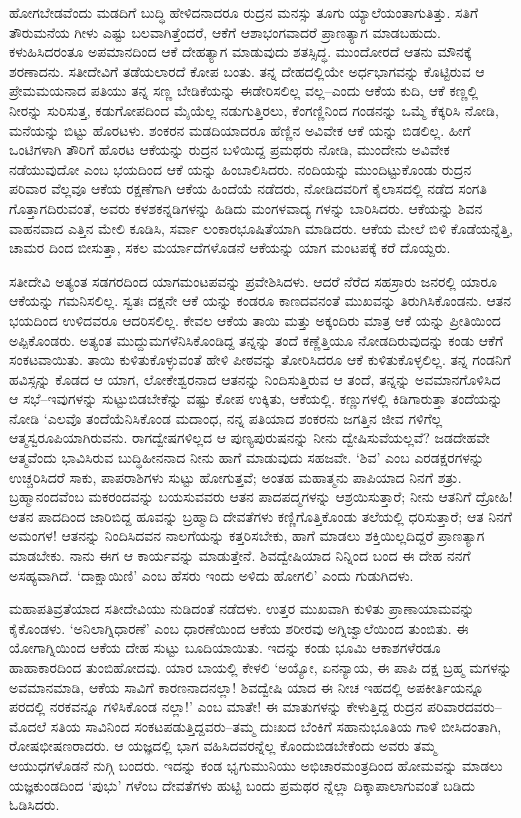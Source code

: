 ಹೋಗಬೇಡವೆಂದು ಮಡದಿಗೆ ಬುದ್ಧಿ ಹೇಳಿದನಾದರೂ ರುದ್ರನ ಮನಸ್ಸು ತೂಗು ಯ್ಯಾಲೆಯಂತಾಗುತಿತ್ತು. ಸತಿಗೆ ತೌರುಮನೆಯ ಗೀಳು ಎಷ್ಟು ಬಲವಾಗಿತ್ತೆಂದರೆ, ಆಕೆಗೆ ಆಶಾಭಂಗವಾದರೆ ಪ್ರಾಣತ್ಯಾಗ ಮಾಡಬಹುದು. ಕಳುಹಿಸಿದರಂತೂ ಅಪಮಾನದಿಂದ ಆಕೆ ದೇಹತ್ಯಾಗ ಮಾಡುವುದು ಶತಸ್ಸಿದ್ಧ. ಮುಂದೋರದೆ ಆತನು ಮೌನಕ್ಕೆ ಶರಣಾದನು. ಸತೀದೇವಿಗೆ ತಡೆಯಲಾರದೆ ಕೋಪ ಬಂತು. ತನ್ನ ದೇಹದಲ್ಲಿಯೇ ಅರ್ಧಭಾಗವನ್ನು ಕೊಟ್ಟಿರುವ ಆ ಪ್ರೇಮಮಯನಾದ ಪತಿಯು ತನ್ನ ಸಣ್ಣ ಬೇಡಿಕೆಯನ್ನು ಈಡೇರಿಸಲಿಲ್ಲ ವಲ್ಲ–ಎಂದು ಆಕೆಯ ಕುದಿ, ಆಕೆ ಕಣ್ಣಲ್ಲಿ ನೀರನ್ನು ಸುರಿಸುತ್ತ, ಕಡುಗೋಪದಿಂದ ಮೈಯೆಲ್ಲ ನಡುಗುತ್ತಿರಲು, ಕೆಂಗಣ್ಣಿನಿಂದ ಗಂಡನನ್ನು ಒಮ್ಮೆ ಕೆಕ್ಕರಿಸಿ ನೋಡಿ, ಮನೆಯನ್ನು ಬಿಟ್ಟು ಹೊರಟಳು. ಶಂಕರನ ಮಡದಿಯಾದರೂ ಹೆಣ್ಣಿನ ಅವಿವೇಕ ಆಕೆ ಯನ್ನು ಬಿಡಲಿಲ್ಲ. ಹೀಗೆ ಒಂಟಿಗಳಾಗಿ ತೌರಿಗೆ ಹೊರಟ ಆಕೆಯನ್ನು ರುದ್ರನ ಬಳಿಯಿದ್ದ ಪ್ರಮಥರು ನೋಡಿ, ಮುಂದೇನು ಅವಿವೇಕ ನಡೆಯುವುದೋ ಎಂಬ ಭಯದಿಂದ ಆಕೆ ಯನ್ನು ಹಿಂಬಾಲಿಸಿದರು. ನಂದಿಯನ್ನು ಮುಂದಿಟ್ಟುಕೊಂಡು ರುದ್ರನ ಪರಿವಾರ ವೆಲ್ಲವೂ ಆಕೆಯ ರಕ್ಷಣೆಗಾಗಿ ಆಕೆಯ ಹಿಂದೆಯೆ ನಡೆದರು, ನೋಡಿದವರಿಗೆ ಕೈಲಾಸದಲ್ಲಿ ನಡೆದ ಸಂಗತಿ ಗೊತ್ತಾಗದಿರುವಂತೆ, ಅವರು ಕಳಶಕನ್ನಡಿಗಳನ್ನು ಹಿಡಿದು ಮಂಗಳವಾದ್ಯ ಗಳನ್ನು ಬಾರಿಸಿದರು. ಆಕೆಯನ್ನು ಶಿವನ ವಾಹನವಾದ ಎತ್ತಿನ ಮೇಲಿ ಕೂಡಿಸಿ, ಸರ್ವಾ ಲಂಕಾರಭೂಷಿತೆಯಾಗಿ ಮಾಡಿದರು. ಆಕೆಯ ಮೇಲೆ ಬಿಳಿ ಕೊಡೆಯನ್ನೆತ್ತಿ, ಚಾಮರ ದಿಂದ ಬೀಸುತ್ತಾ, ಸಕಲ ಮರ್ಯಾದೆಗಳೊಡನೆ ಆಕೆಯನ್ನು ಯಾಗ ಮಂಟಪಕ್ಕೆ ಕರೆ ದೊಯ್ದರು.

ಸತೀದೇವಿ ಅತ್ಯಂತ ಸಡಗರದಿಂದ ಯಾಗಮಂಟಪವನ್ನು ಪ್ರವೇಶಿಸಿದಳು. ಆದರೆ ನೆರೆದ ಸಹಸ್ರಾರು ಜನರಲ್ಲಿ ಯಾರೂ ಆಕೆಯನ್ನು ಗಮನಿಸಲಿಲ್ಲ. ಸ್ವತಃ ದಕ್ಷನೇ ಆಕೆ ಯನ್ನು ಕಂಡರೂ ಕಾಣದವನಂತೆ ಮುಖವನ್ನು ತಿರುಗಿಸಿಕೊಂಡನು. ಆತನ ಭಯದಿಂದ ಉಳಿದವರೂ ಆದರಿಸಲಿಲ್ಲ. ಕೇವಲ ಆಕೆಯ ತಾಯಿ ಮತ್ತು ಅಕ್ಕಂದಿರು ಮಾತ್ರ ಆಕೆ ಯನ್ನು ಪ್ರೀತಿಯಿಂದ ಅಪ್ಪಿಕೊಂಡರು. ಅತ್ಯಂತ ಮುದ್ದುಮಗಳೆನಿಸಿಕೊಂಡಿದ್ದ ತನ್ನನ್ನು ತಂದೆ ಕಣ್ಣೆತ್ತಿಯೂ ನೋಡದಿರುವುದನ್ನು ಕಂಡು ಆಕೆಗೆ ಸಂಕಟವಾಯಿತು. ತಾಯಿ ಕುಳಿತುಕೊಳ್ಳುವಂತೆ ಹೇಳಿ ಪೀಠವನ್ನು ತೋರಿಸಿದರೂ ಆಕೆ ಕುಳಿತುಕೊಳ್ಳಲಿಲ್ಲ. ತನ್ನ ಗಂಡನಿಗೆ ಹವಿಸ್ಸನ್ನು ಕೊಡದ ಆ ಯಾಗ, ಲೋಕೇಶ್ವರನಾದ ಆತನನ್ನು ನಿಂದಿಸುತ್ತಿರುವ ಆ ತಂದೆ, ತನ್ನನ್ನು ಅವಮಾನಗೊಳಿಸಿದ ಆ ಸಭೆ–ಇವುಗಳನ್ನು ಸುಟ್ಟುಬಿಡಬೇಕೆನ್ನು ವಷ್ಟು ಕೋಪ ಉಕ್ಕಿತು, ಆಕೆಯಲ್ಲಿ. ಕಣ್ಣುಗಳಲ್ಲಿ ಕಿಡಿಗಾರುತ್ತಾ ತಂದೆಯನ್ನು ನೋಡಿ ‘ಎಲವೊ ತಂದೆಯೆನಿಸಿಕೊಂಡ ಮದಾಂಧ, ನನ್ನ ಪತಿಯಾದ ಶಂಕರನು ಜಗತ್ತಿನ ಜೀವ ಗಳಿಗೆಲ್ಲ ಆತ್ಮಸ್ವರೂಪಿಯಾಗಿರುವನು. ರಾಗದ್ವೇಷಗಳಿಲ್ಲದ ಆ ಪುಣ್ಯಪುರುಷನನ್ನು ನೀನು ದ್ವೇಷಿಸುವೆಯಲ್ಲವೆ? ಜಡದೇಹವೇ ಆತ್ಮವೆಂದು ಭಾವಿಸಿರುವ ಬುದ್ಧಿಹೀನನಾದ ನೀನು ಹಾಗೆ ಮಾಡುವುದು ಸಹಜವೇ. ‘ಶಿವ’ ಎಂಬ ಎರಡಕ್ಷರಗಳನ್ನು ಉಚ್ಚರಿಸಿದರೆ ಸಾಕು, ಪಾಪರಾಶಿಗಳು ಸುಟ್ಟು ಹೋಗುತ್ತವೆ; ಅಂತಹ ಮಹಾತ್ಮನು ಪಾಪಿಯಾದ ನಿನಗೆ ಶತ್ರು. ಬ್ರಹ್ಮಾನಂದವೆಂಬ ಮಕರಂದವನ್ನು ಬಯಸುವವರು ಆತನ ಪಾದಪದ್ಮಗಳನ್ನು ಆಶ್ರಯಿಸುತ್ತಾರೆ; ನೀನು ಆತನಿಗೆ ದ್ರೋಹಿ! ಆತನ ಪಾದದಿಂದ ಜಾರಿಬಿದ್ದ ಹೂವನ್ನು ಬ್ರಹ್ಮಾದಿ ದೇವತೆಗಳು ಕಣ್ಣಿಗೊತ್ತಿಕೊಂಡು ತಲೆಯಲ್ಲಿ ಧರಿಸುತ್ತಾರೆ; ಆತ ನಿನಗೆ ಅಮಂಗಳ! ಆತನನ್ನು ನಿಂದಿಸಿದವನ ನಾಲಗೆಯನ್ನು ಕತ್ತರಿಸಬೇಕು, ಹಾಗೆ ಮಾಡಲು ಶಕ್ತಿಯಿಲ್ಲದಿದ್ದರೆ ಪ್ರಾಣತ್ಯಾಗ ಮಾಡಬೇಕು. ನಾನು ಈಗ ಆ ಕಾರ್ಯವನ್ನು ಮಾಡುತ್ತೇನೆ. ಶಿವದ್ವೇಷಿಯಾದ ನಿನ್ನಿಂದ ಬಂದ ಈ ದೇಹ ನನಗೆ ಅಸಹ್ಯವಾಗಿದೆ. ‘ದಾಕ್ಷಾಯಿಣಿ’ ಎಂಬ ಹೆಸರು ಇಂದು ಅಳಿದು ಹೋಗಲಿ’ ಎಂದು ಗುಡುಗಿದಳು.

ಮಹಾಪತಿವ್ರತೆಯಾದ ಸತೀದೇವಿಯು ನುಡಿದಂತೆ ನಡೆದಳು. ಉತ್ತರ ಮುಖವಾಗಿ ಕುಳಿತು ಪ್ರಾಣಾಯಾಮವನ್ನು ಕೈಕೊಂಡಳು. ‘ಅನಿಲಾಗ್ನಿಧಾರಣೆ’ ಎಂಬ ಧಾರಣೆಯಿಂದ ಆಕೆಯ ಶರೀರವು ಅಗ್ನಿಜ್ವಾಲೆಯಿಂದ ತುಂಬಿತು. ಈ ಯೋಗಾಗ್ನಿಯಿಂದ ಆಕೆಯ ದೇಹ ಸುಟ್ಟು ಬೂದಿಯಾಯಿತು. ಇದನ್ನು ಕಂಡು ಭೂಮಿ ಆಕಾಶಗಳೆರಡೂ ಹಾಹಾಕಾರದಿಂದ ತುಂಬಿಹೋದವು. ಯಾರ ಬಾಯಲ್ಲಿ ಕೇಳಲಿ ‘ಅಯ್ಯೋ, ಏನನ್ಯಾಯ, ಈ ಪಾಪಿ ದಕ್ಷ ಬ್ರಹ್ಮ ಮಗಳನ್ನು ಅವಮಾನಮಾಡಿ, ಆಕೆಯ ಸಾವಿಗೆ ಕಾರಣನಾದನಲ್ಲಾ! ಶಿವದ್ವೇಷಿ ಯಾದ ಈ ನೀಚ ಇಹದಲ್ಲಿ ಅಪಕೀರ್ತಿಯನ್ನೂ ಪರದಲ್ಲಿ ನರಕವನ್ನೂ ಗಳಿಸಿಕೊಂಡ ನಲ್ಲಾ!’ ಎಂಬ ಮಾತೇ! ಈ ಮಾತುಗಳನ್ನು ಕೇಳುತ್ತಿದ್ದ ರುದ್ರನ ಪರಿವಾರದವರು– ಮೊದಲೆ ಸತಿಯ ಸಾವಿನಿಂದ ಸಂಕಟಪಡುತ್ತಿದ್ದವರು–ತಮ್ಮ ದುಃಖದ ಬೆಂಕಿಗೆ ಸಹಾನುಭೂತಿಯ ಗಾಳಿ ಬೀಸಿದಂತಾಗಿ, ರೋಷಭೀಷಣರಾದರು. ಆ ಯಜ್ಞದಲ್ಲಿ ಭಾಗ ವಹಿಸಿದವರನ್ನೆಲ್ಲ ಕೊಂದುಬಿಡಬೇಕೆಂದು ಅವರು ತಮ್ಮ ಆಯುಧಗಳೊಡನೆ ನುಗ್ಗಿ ಬಂದರು. ಇದನ್ನು ಕಂಡ ಭೃಗುಮುನಿಯು ಅಭಿಚಾರಮಂತ್ರದಿಂದ ಹೋಮವನ್ನು ಮಾಡಲು ಯಜ್ಞಕುಂಡದಿಂದ ‘ಪುಭು’ ಗಳೆಂಬ ದೇವತೆಗಳು ಹುಟ್ಟಿ ಬಂದು ಪ್ರಮಥರ ನ್ನೆಲ್ಲಾ ದಿಕ್ಕಾಪಾಲಾಗುವಂತೆ ಬಡಿದು ಓಡಿಸಿದರು.

